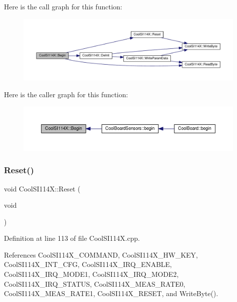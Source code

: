 Here is the call graph for this function\+:\nopagebreak
\begin{figure}[H]
\begin{center}
\leavevmode
\includegraphics[width=350pt]{dd/d67/class_cool_s_i114_x_a206b36aca7049f63be1d11088c30a09f_cgraph}
\end{center}
\end{figure}
Here is the caller graph for this function\+:\nopagebreak
\begin{figure}[H]
\begin{center}
\leavevmode
\includegraphics[width=350pt]{dd/d67/class_cool_s_i114_x_a206b36aca7049f63be1d11088c30a09f_icgraph}
\end{center}
\end{figure}
\mbox{\label{class_cool_s_i114_x_a9d9f9c9129c0c29ed497f8563f3dd823}} 
\subsubsection{\texorpdfstring{Reset()}{Reset()}}
{\footnotesize\ttfamily void Cool\+S\+I114\+X\+::\+Reset (\begin{DoxyParamCaption}\item[{void}]{ }\end{DoxyParamCaption})}



Definition at line 113 of file Cool\+S\+I114\+X.\+cpp.



References Cool\+S\+I114\+X\+\_\+\+C\+O\+M\+M\+A\+ND, Cool\+S\+I114\+X\+\_\+\+H\+W\+\_\+\+K\+EY, Cool\+S\+I114\+X\+\_\+\+I\+N\+T\+\_\+\+C\+FG, Cool\+S\+I114\+X\+\_\+\+I\+R\+Q\+\_\+\+E\+N\+A\+B\+LE, Cool\+S\+I114\+X\+\_\+\+I\+R\+Q\+\_\+\+M\+O\+D\+E1, Cool\+S\+I114\+X\+\_\+\+I\+R\+Q\+\_\+\+M\+O\+D\+E2, Cool\+S\+I114\+X\+\_\+\+I\+R\+Q\+\_\+\+S\+T\+A\+T\+US, Cool\+S\+I114\+X\+\_\+\+M\+E\+A\+S\+\_\+\+R\+A\+T\+E0, Cool\+S\+I114\+X\+\_\+\+M\+E\+A\+S\+\_\+\+R\+A\+T\+E1, Cool\+S\+I114\+X\+\_\+\+R\+E\+S\+ET, and Write\+Byte().



